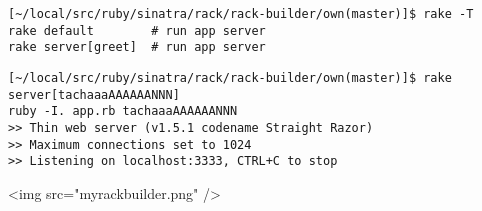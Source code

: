 \begin{verbatim}
[~/local/src/ruby/sinatra/rack/rack-builder/own(master)]$ rake -T
rake default        # run app server
rake server[greet]  # run app server
\end{verbatim}

\begin{verbatim}
[~/local/src/ruby/sinatra/rack/rack-builder/own(master)]$ rake server[tachaaaAAAAAANNN]
ruby -I. app.rb tachaaaAAAAAANNN
>> Thin web server (v1.5.1 codename Straight Razor)
>> Maximum connections set to 1024
>> Listening on localhost:3333, CTRL+C to stop
\end{verbatim}

\begin{rawhtml}
<img src="myrackbuilder.png" />
\end{rawhtml}

